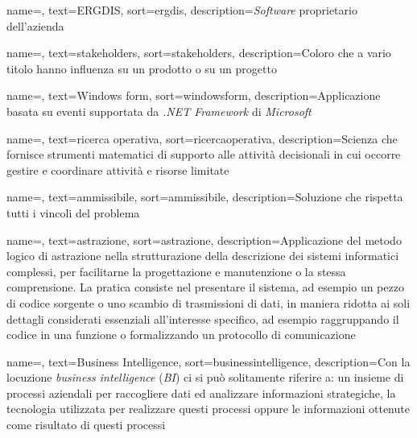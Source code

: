 {
    name=,
    text=ERGDIS,
    sort=ergdis,
    description={\textit{Software} proprietario dell'azienda \textit{\myCompany}}
}

{
    name=,
    text=stakeholders,
    sort=stakeholders,
    description={Coloro che a vario titolo hanno influenza su un
    prodotto o su un progetto}
}

{
    name=,
    text=Windows form,
    sort=windowsform,
    description={Applicazione basata su eventi
    supportata da \textit{.NET Framework} di \textit{Microsoft} \cite{site:wiki}}
}

{
    name=,
    text=ricerca operativa,
    sort=ricercaoperativa,
    description={Scienza che fornisce strumenti matematici di
    supporto alle attività decisionali in cui occorre gestire
    e coordinare attività e risorse limitate \cite{site:wiki}}
}

{
    name=,
    text=ammissibile,
    sort=ammissibile,
    description={Soluzione che rispetta tutti i vincoli del problema}
}

{
    name=,
    text=astrazione,
    sort=astrazione,
    description={Applicazione del metodo logico di astrazione nella strutturazione della
    descrizione dei sistemi informatici complessi, per facilitarne la progettazione e
    manutenzione o la stessa comprensione. La pratica consiste nel presentare il
    sistema, ad esempio un pezzo di codice sorgente o uno scambio di trasmissioni di
    dati, in maniera ridotta ai soli dettagli considerati essenziali all’interesse specifico,
    ad esempio raggruppando il codice in una funzione o formalizzando un protocollo
    di comunicazione \cite{site:wiki}}
}

{
    name=,
    text=Business Intelligence,
    sort=businessintelligence,
    description={Con la locuzione \textit{business intelligence}
    (\textit{BI}) ci si può solitamente riferire a: un insieme di processi aziendali per raccogliere dati ed analizzare
    informazioni strategiche, la tecnologia utilizzata per realizzare questi processi
    oppure le informazioni ottenute come risultato di questi processi \cite{site:wiki}}
}

